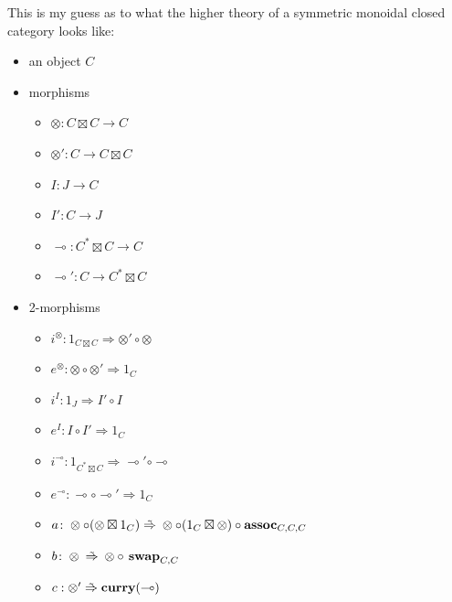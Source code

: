 \documentclass[12pt,twoside,openright]{report}
\newcommand{\maps}{\colon}
\newcommand{\lhom}{\multimap}
\newcommand{\tensor}{\otimes}
\newcommand{\mbold}[1]{\mbox{\bf #1}}
\newcommand{\too}{\Rightarrow}
\newcommand{\isotoo}{\; \tilde{\Rightarrow} \;}
\begin{document}
This is my guess as to what the higher theory of a symmetric monoidal closed category looks like:
\begin{itemize}
  \item an object $C$
  \item morphisms
  \begin{itemize}
    \item $\tensor \maps C \boxtimes C \to C$
    \item $\tensor' \maps C \to C \boxtimes C$
    \item $I \maps J \to C$
    \item $I' \maps C \to J$
    \item $\lhom \maps C^* \boxtimes C \to C$
    \item $\lhom' \maps C \to C^* \boxtimes C$
  \end{itemize}
  \item 2-morphisms
  \begin{itemize}
    \item $i^\tensor\maps 1_{C \boxtimes C} \too \tensor' \circ \tensor$
    \item $e^\tensor\maps \tensor \circ \tensor' \too 1_C$\\

    \item $i^I\maps 1_J \too I' \circ I$
    \item $e^I\maps I \circ I' \too 1_C$\\

    \item $i^\lhom\maps 1_{C^* \boxtimes C} \too \lhom' \circ \lhom$
    \item $e^\lhom\maps \lhom \circ \lhom' \too 1_C$\\

    \item $a\maps \tensor \circ (\tensor \boxtimes 1_C) \isotoo \tensor \circ (1_C \boxtimes \tensor) \circ \mbold{assoc}_{C, C, C}$
    \item $b\maps \tensor \isotoo \tensor \circ \mbold{~swap}_{C, C}$
    \item $c:\tensor' \isotoo \mbold{curry}(\lhom)$
    

\end{itemize}
\end{itemize}
\end{document}
